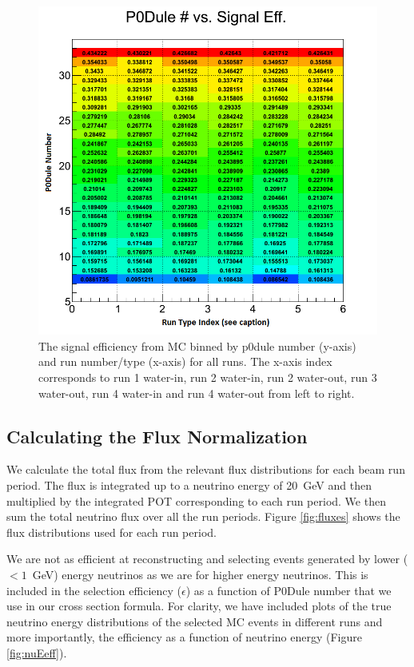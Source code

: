 \clearpage

\begin{figure}[h]
\centering
\includegraphics[width=5in]{Figures/TN100Plots/cEff_RvZ.png}
\caption{The signal efficiency from MC binned by p0dule number (y-axis) and run number/type (x-axis) for all runs. The x-axis index corresponds to run 1 water-in, run 2 water-in, run 2 water-out, run 3 water-out, run 4 water-in and run 4 water-out from left to right.}
\label{fig:xseffvZ}
\end{figure}

\subsection{Calculating the Flux Normalization}

We calculate the total flux from the relevant flux distributions for each beam run period. The flux is integrated up to a neutrino energy of 20~GeV and then multiplied by the integrated POT corresponding to each run period. We then sum the total neutrino flux over all the run periods. Figure \ref{fig:fluxes} shows the flux distributions used for each run period.

We are not as efficient at reconstructing and selecting events generated by lower ($<1$~GeV) energy neutrinos as we are for higher energy neutrinos. This is included in the selection efficiency ($\epsilon$) as a function of P0Dule number that we use in our cross section formula. For clarity, we have included plots of the true neutrino energy distributions of the selected MC events in different runs and more importantly, the efficiency as a function of neutrino energy (Figure \ref{fig:nuEeff}).

